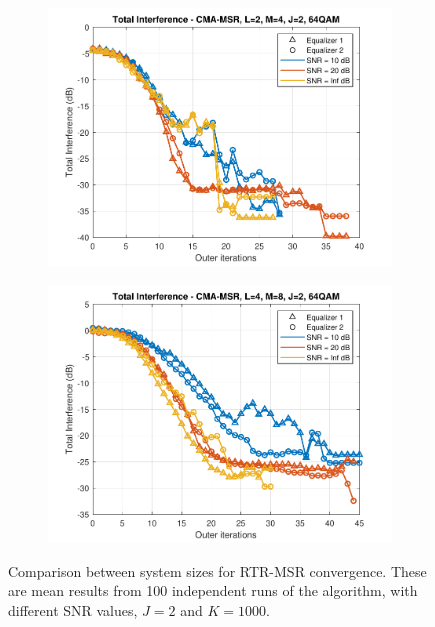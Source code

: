 \begin{figure}
\begin{subfigure}[b]{0.45\textwidth}
		\includegraphics[width=\linewidth]{./figs/BF_RTR_MSR_TI_64QAM_L=2_M=4_J=2_K=1000.pdf}
		\label{fig:rtr_msr_ti64_24}
	\end{subfigure}
	\begin{subfigure}[b]{0.45\textwidth}
		\includegraphics[width=\linewidth]{./figs/BF_RTR_MSR_TI_64QAM_L=4_M=8_J=2_K=1000.pdf}
		\label{fig:rtr_msr_ti64_48}
	\end{subfigure}
	\caption{Comparison between system sizes for RTR-MSR convergence. These are mean results from 100 independent runs of the algorithm, with different SNR values, $J=2$ and $K=1000$.}
	\label{fig:CMA_RTR_msr_size_qpsk}
\end{figure}
